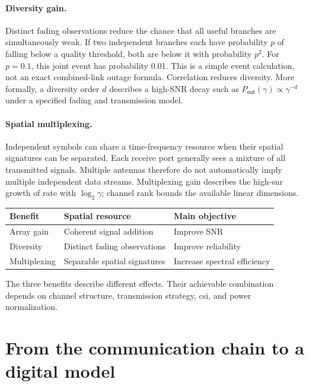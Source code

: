 \paragraph{Diversity gain.}
Distinct fading observations reduce the chance that all useful branches are simultaneously weak. If two independent branches each have probability $p$ of falling below a quality threshold, both are below it with probability $p^2$. For $p=0.1$, this joint event has probability 0.01. This is a simple event calculation, not an exact combined-link outage formula. Correlation reduces diversity. More formally, a diversity order $d$ describes a high-SNR decay such as $P_{\mathsf{out}}(\gamma)\propto\gamma^{-d}$ under a specified fading and transmission model.

\paragraph{Spatial multiplexing.}
Independent symbols can share a time-frequency resource when their spatial signatures can be separated. Each receive port generally sees a mixture of all transmitted signals. Multiple antennas therefore do not automatically imply multiple independent data streams. Multiplexing gain describes the high-\ac{snr} growth of rate with $\log_2\gamma$; channel rank bounds the available linear dimensions.

\begin{center}
\begin{tabular}{lll}\toprule
Benefit & Spatial resource & Main objective\\\midrule
Array gain & Coherent signal addition & Improve SNR\\
Diversity & Distinct fading observations & Improve reliability\\
Multiplexing & Separable spatial signatures & Increase spectral efficiency\\\bottomrule
\end{tabular}
\end{center}
The three benefits describe different effects. Their achievable combination depends on channel structure, transmission strategy, \ac{csi}, and power normalization.

\section{From the communication chain to a digital model}
